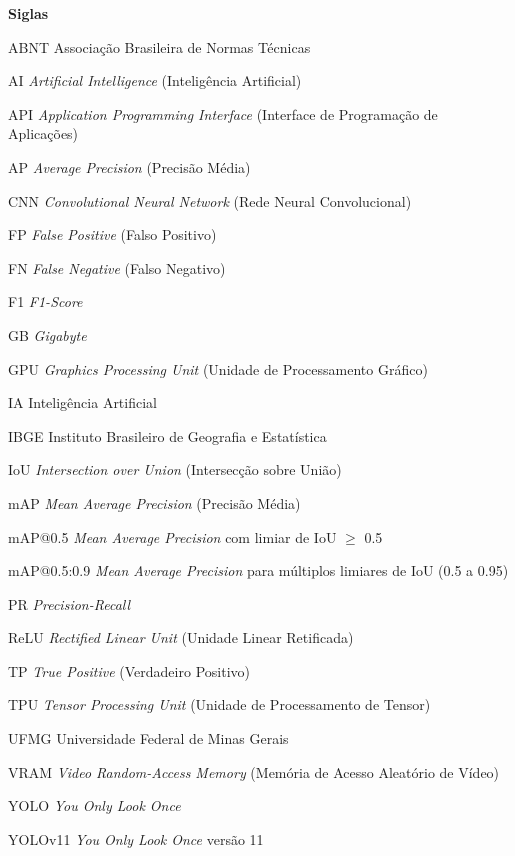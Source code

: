 \documentclass[
	12pt,				%
	openright,			%
	oneside,			%
	a4paper,			%
	english,			%
	french,				%
	spanish,			%
	brazil,				%
	]{abntex2}
\begin{document}
\begin{siglas}
  \item[\textbf{Siglas}]
  \item[ABNT] Associação Brasileira de Normas Técnicas
  \item[AI] \textit{Artificial Intelligence} (Inteligência Artificial)
  \item[API] \textit{Application Programming Interface} (Interface de Programação de Aplicações)
  \item[AP] \textit{Average Precision} (Precisão Média)
  \item[CNN] \textit{Convolutional Neural Network} (Rede Neural Convolucional)
  \item[FP] \textit{False Positive} (Falso Positivo)
  \item[FN] \textit{False Negative} (Falso Negativo)
  \item[F1] \textit{F1-Score}
  \item[GB] \textit{Gigabyte}
  \item[GPU] \textit{Graphics Processing Unit} (Unidade de Processamento Gráfico)
  \item[IA] Inteligência Artificial
  \item[IBGE] Instituto Brasileiro de Geografia e Estatística
  \item[IoU] \textit{Intersection over Union} (Intersecção sobre União)
  \item[mAP] \textit{Mean Average Precision} (Precisão Média)
  \item[mAP@0.5] \textit{Mean Average Precision} com limiar de IoU $\geq$ 0.5
  \item[mAP@0.5:0.9] \textit{Mean Average Precision} para múltiplos limiares de IoU (0.5 a 0.95)
  \item[PR] \textit{Precision-Recall}
  \item[ReLU] \textit{Rectified Linear Unit} (Unidade Linear Retificada)
  \item[TP] \textit{True Positive} (Verdadeiro Positivo)
  \item[TPU] \textit{Tensor Processing Unit} (Unidade de Processamento de Tensor)
  \item[UFMG] Universidade Federal de Minas Gerais
  \item[VRAM] \textit{Video Random-Access Memory} (Memória de Acesso Aleatório de Vídeo)
  \item[YOLO] \textit{You Only Look Once}
  \item[YOLOv11] \textit{You Only Look Once} versão 11
\end{siglas}
\end{document}
